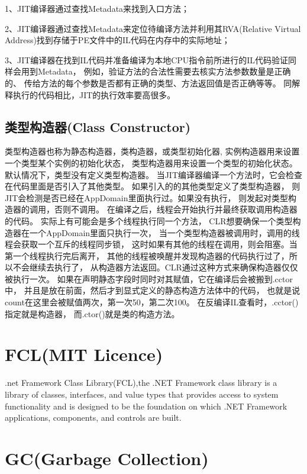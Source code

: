 \documentclass{book}
\begin{document}
1、JIT编译器通过查找Metadata来找到入口方法；

2、JIT编译器通过查找Metadata来定位待编译方法并利用其RVA(Relative Virtual Address)找到存储于PE文件中的IL代码在内存中的实际地址；

3、JIT编译器在找到IL代码并准备编译为本地CPU指令前所进行的IL代码验证同样会用到Metadata，
例如，验证方法的合法性需要去核实方法参数数量是正确的、
传给方法的每个参数是否都有正确的类型、方法返回值是否正确等等。
同解释执行的代码相比，JIT的执行效率要高很多。

\subsection{类型构造器(Class Constructor)}

类型构造器也称为静态构造器，类构造器，或类型初始化器,
实例构造器用来设置一个类型某个实例的初始化状态，
类型构造器用来设置一个类型的初始化状态。默认情况下，类型没有定义类型构造器。
当JIT编译器编译一个方法时，它会检查在代码里面是否引入了其他类型。
如果引入的的其他类型定义了类型构造器，
则JIT会检测是否已经在AppDomain里面执行过。如果没有执行，
则发起对类型构造器的调用，否则不调用。
在编译之后，线程会开始执行并最终获取调用构造器的代码。
实际上有可能会是多个线程执行同一个方法，
CLR想要确保一个类型构造器在一个AppDomain里面只执行一次，
当一个类型构造器被调用时，调用的线程会获取一个互斥的线程同步锁，
这时如果有其他的线程在调用，则会阻塞。当第一个线程执行完后离开，
其他的线程被唤醒并发现构造器的代码执行过了，所以不会继续去执行了，
从构造器方法返回。CLR通过这种方式来确保构造器仅仅被执行一次。
如果在声明静态字段时同时对其赋值，它在编译后会被搬到.cctor中，
并且是放在前面，然后才到显式定义的静态构造方法体中的代码，
也就是说count在这里会被赋值两次，第一次50，第二次100。
在反编译IL查看时，.cctor()指定就是构造器，
而.ctor()就是类的构造方法。

\section{FCL(MIT Licence)}

.net Framework Class Library(FCL),the .NET Framework class library is a library of classes, interfaces, and value types that provides access to system functionality and is designed
 to be the foundation on which .NET Framework applications, components, and controls are built.

\section{GC(Garbage Collection)}
\end{document}
